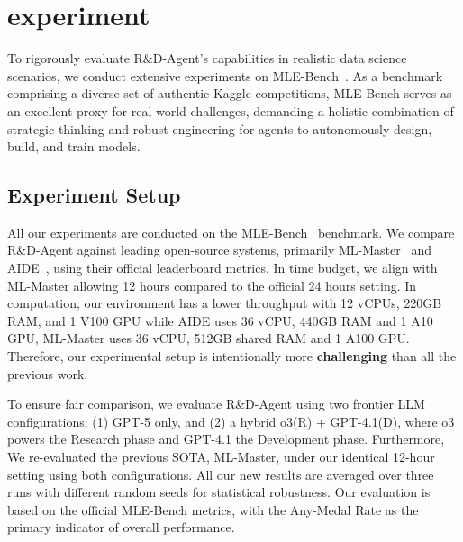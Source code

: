 \section{experiment}

To rigorously evaluate R\&D-Agent's capabilities in realistic data science scenarios, we conduct extensive experiments on MLE-Bench~\citep{chan2024mle-bench}. As a benchmark comprising a diverse set of authentic Kaggle competitions, MLE-Bench serves as an excellent proxy for real-world challenges, demanding a holistic combination of strategic thinking and robust engineering for agents to autonomously design, build, and train models.

\subsection{Experiment Setup}
\label{sec:exp_setup}
All our experiments are conducted on the MLE-Bench~\citep{chan2024mle-bench} benchmark. We compare R\&D-Agent against leading open-source systems, primarily ML-Master~\citep{liu2025ml} and AIDE~\citep{aide2025}, using their official leaderboard metrics. 
In time budget, we align with ML-Master allowing 12 hours compared to the official 24 hours setting. In computation, our environment has a lower throughput with 12 vCPUs, 220GB RAM, and 1 V100 GPU while AIDE uses 36 vCPU, 440GB RAM and 1 A10 GPU, ML-Master uses 36 vCPU, 512GB shared  RAM and 1 A100 GPU. Therefore, our experimental setup is intentionally more \textbf{challenging} than all the previous work. 

To ensure fair comparison, we evaluate R\&D-Agent using two frontier LLM configurations: (1) GPT-5 only, and (2) a hybrid o3(R) + GPT-4.1(D), where o3 powers the Research phase and GPT-4.1 the Development phase. Furthermore, We re-evaluated the previous SOTA, ML-Master, under our identical 12-hour setting using both configurations. All our new results are averaged over three runs with different random seeds for statistical robustness. Our evaluation is based on the official MLE-Bench metrics, with the Any-Medal Rate as the primary indicator of overall performance.






